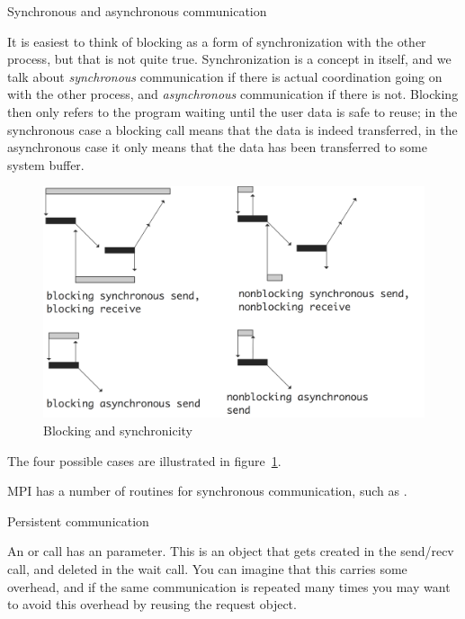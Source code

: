  {Synchronous and asynchronous communication}


It is easiest to think of blocking as a form of synchronization with
the other process, but that is not quite true. Synchronization is a
concept in itself, and we talk about \emph{synchronous} communication
if there is actual coordination going on with the other process,
and \emph{asynchronous} communication if there is not. Blocking then
only refers to the program waiting until the user data is safe
to reuse; in the synchronous case a blocking call means that the data
is indeed transferred, in the asynchronous case it only means that the
data has been transferred to some system buffer.
%
\begin{figure}[ht]
\includegraphics[scale=.15]{graphics/block-vs-sync}
\caption{Blocking and synchronicity}
\label{fig:block-sync}
\end{figure}
The four possible cases are illustrated in figure~\ref{fig:block-sync}.

MPI has a number of routines for synchronous communication,
such as .



 {Persistent communication}
\label{sec:persistent}

An  or  call has an
 parameter.  This is an object that gets
created in the send/recv call, and deleted in the wait call. You can
imagine that this carries some overhead, and if the same communication
is repeated many times you may want to avoid this overhead by reusing
the request object.

